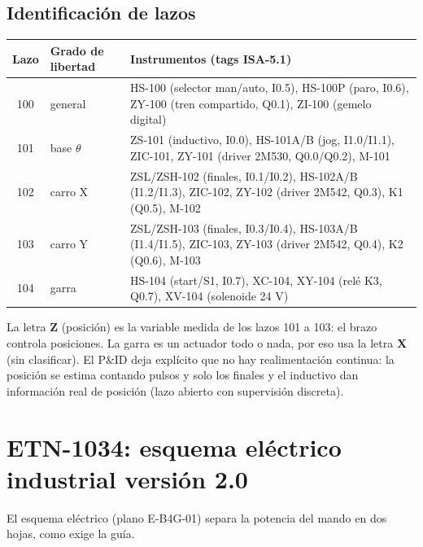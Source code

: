 \documentclass[a4paper,11pt]{article}
\begin{document}
\subsection{Identificación de lazos}
\begin{center}\small
\begin{tabularx}{\linewidth}{c >{\raggedright}p{2.6cm} >{\ttfamily\raggedright\arraybackslash}X}
\toprule
\textbf{Lazo} & \textbf{Grado de libertad} & \textrm{\textbf{Instrumentos (tags ISA-5.1)}}\\
\midrule
100 & general & HS-100 (selector man/auto, I0.5), HS-100P (paro, I0.6), ZY-100 (tren compartido, Q0.1), ZI-100 (gemelo digital)\\
101 & base $\theta$ & ZS-101 (inductivo, I0.0), HS-101A/B (jog, I1.0/I1.1), ZIC-101, ZY-101 (driver 2M530, Q0.0/Q0.2), M-101\\
102 & carro X & ZSL/ZSH-102 (finales, I0.1/I0.2), HS-102A/B (I1.2/I1.3), ZIC-102, ZY-102 (driver 2M542, Q0.3), K1 (Q0.5), M-102\\
103 & carro Y & ZSL/ZSH-103 (finales, I0.3/I0.4), HS-103A/B (I1.4/I1.5), ZIC-103, ZY-103 (driver 2M542, Q0.4), K2 (Q0.6), M-103\\
104 & garra & HS-104 (start/S1, I0.7), XC-104, XY-104 (relé K3, Q0.7), XV-104 (solenoide 24 V)\\
\bottomrule
\end{tabularx}
\end{center}
La letra \textbf{Z} (posición) es la variable medida de los lazos 101 a 103: el brazo controla posiciones. La garra es un actuador todo o nada, por eso usa la letra \textbf{X} (sin clasificar). El P\&ID deja explícito que no hay realimentación continua: la posición se estima contando pulsos y solo los finales y el inductivo dan información real de posición (lazo abierto con supervisión discreta).

\section{ETN-1034: esquema eléctrico industrial versión 2.0}
El esquema eléctrico (plano E-B4G-01) separa la potencia del mando en dos hojas, como exige la guía.


\end{document}
